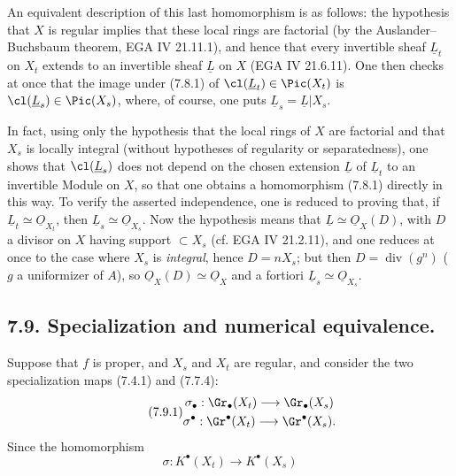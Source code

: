 An equivalent description of this last homomorphism is as follows: the hypothesis that \(X\) is regular implies that these local rings are factorial (by the Auslander--Buchsbaum theorem, EGA IV 21.11.1), and hence that every invertible sheaf \(\underline{L}_t\) on \(X_t\) extends to an invertible sheaf \(\underline{L}\) on \(X\) (EGA IV 21.6.11). One then checks at once that the image under (7.8.1) of \(\cl(\underline{L}_t)\in\Pic(X_t)\) is \(\cl(\underline{L}_s)\in\Pic(X_s)\), where, of course, one puts \(\underline{L}_s=\underline{L}|X_s\).

In fact, using only the hypothesis that the local rings of \(X\) are factorial and that \(X_s\) is locally integral (without hypotheses of regularity or separatedness), one shows that \(\cl(\underline{L}_s)\) does not depend on the chosen extension \(\underline{L}\) of \(\underline{L}_t\) to an invertible Module on \(X\), so that one obtains a homomorphism (7.8.1) directly in this way. To verify the asserted independence, one is reduced to proving that, if \(\underline{L}_t\simeq\underline{O}_{X_t}\), then \(\underline{L}_s\simeq\underline{O}_{X_s}\). Now the hypothesis means that \(\underline{L}\simeq\underline{O}_X(D)\), with \(D\) a divisor on \(X\) having support \(\subset X_s\) (cf. EGA IV 21.2.11), and one reduces at once to the case where \(X_s\) is \emph{integral}, hence \(D=nX_s\); but then \(D=\operatorname{div}(g^n)\) (\(g\) a uniformizer of \(A\)), so \(\underline{O}_X(D)\simeq\underline{O}_X\) and a fortiori \(\underline{L}_s\simeq\underline{O}_{X_s}\).

\subsection*{7.9. Specialization and numerical equivalence.}
Suppose that \(f\) is proper, and \(X_s\) and \(X_t\) are regular, and consider the two specialization maps (7.4.1) and (7.7.4):
\begin{equation}\tag{7.9.1}
\begin{gathered}
  \sigma_\bullet:\Gr_\bullet(X_t)\longrightarrow\Gr_\bullet(X_s)\\
  \sigma^\bullet:\Gr^\bullet(X_t)\longrightarrow\Gr^\bullet(X_s).
\end{gathered}
\end{equation}
Since the homomorphism
\begin{equation}\tag{7.9.2}
  \sigma:K^\bullet(X_t)\longrightarrow K^\bullet(X_s)
\end{equation}

